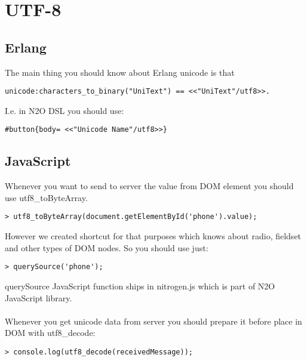 \section{UTF-8}

\subsection{Erlang}

The main thing you should know about Erlang unicode is that

\vspace{1\baselineskip}
\begin{lstlisting}
unicode:characters_to_binary("UniText") == <<"UniText"/utf8>>.
\end{lstlisting}
\vspace{1\baselineskip}

I.e. in N2O DSL you should use:

\vspace{1\baselineskip}
\begin{lstlisting}
#button{body= <<"Unicode Name"/utf8>>}
\end{lstlisting}
\vspace{1\baselineskip}

\subsection{JavaScript}

Whenever you want to send to server the value from DOM element
you should use utf8\_toByteArray.

\vspace{1\baselineskip}
\begin{lstlisting}
> utf8_toByteArray(document.getElementById('phone').value);
\end{lstlisting}
\vspace{1\baselineskip}

However we created shortcut for that purposes which knows
about radio, fieldset and other types of DOM nodes. So you should use just:

\vspace{1\baselineskip}
\begin{lstlisting}
> querySource('phone');
\end{lstlisting}
\vspace{1\baselineskip}

querySource JavaScript function ships in nitrogen.js which is part
of N2O JavaScript library.

\paragraph{}
Whenever you get unicode data from server you should prepare it before place
in DOM with utf8\_decode:

\vspace{1\baselineskip}
\begin{lstlisting}
> console.log(utf8_decode(receivedMessage));
\end{lstlisting}
\vspace{1\baselineskip}
